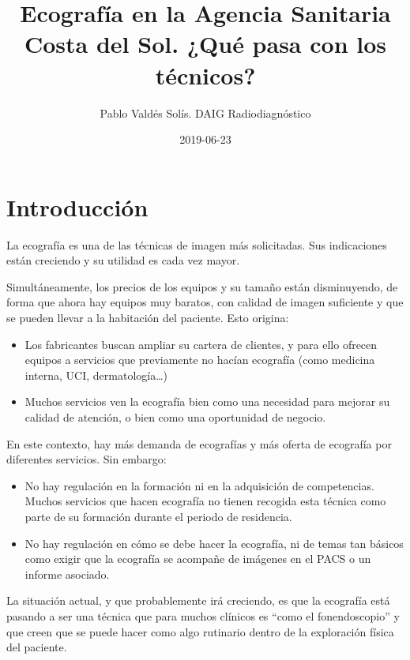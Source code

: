 \documentclass[]{article}
\title{Ecografía en la Agencia Sanitaria Costa del Sol. ¿Qué pasa con los técnicos?}
\author{Pablo Valdés Solís. DAIG Radiodiagnóstico}
\date{2019-06-23}
\providecommand{\tightlist}{%
  \setlength{\itemsep}{0pt}\setlength{\parskip}{0pt}}
\begin{document}
\maketitle

{
\setcounter{tocdepth}{2}
\tableofcontents
}
\hypertarget{introduccion}{%
\section{Introducción}\label{introduccion}}

La ecografía es una de las técnicas de imagen más solicitadas. Sus indicaciones están creciendo y su utilidad es cada vez mayor.

Simultáneamente, los precios de los equipos y su tamaño están disminuyendo, de forma que ahora hay equipos muy baratos, con calidad de imagen suficiente y que se pueden llevar a la habitación del paciente. Esto origina:

\begin{itemize}
\tightlist
\item
  Los fabricantes buscan ampliar su cartera de clientes, y para ello ofrecen equipos a servicios que previamente no hacían ecografía (como medicina interna, UCI, dermatología\ldots{})
\item
  Muchos servicios ven la ecografía bien como una necesidad para mejorar su calidad de atención, o bien como una oportunidad de negocio.
\end{itemize}

En este contexto, hay más demanda de ecografías y más oferta de ecografía por diferentes servicios. Sin embargo:

\begin{itemize}
\tightlist
\item
  No hay regulación en la formación ni en la adquisición de competencias. Muchos servicios que hacen ecografía no tienen recogida esta técnica como parte de su formación durante el periodo de residencia.
\item
  No hay regulación en cómo se debe hacer la ecografía, ni de temas tan básicos como exigir que la ecografía se acompañe de imágenes en el PACS o un informe asociado.
\end{itemize}

La situación actual, y que probablemente irá creciendo, es que la ecografía está pasando a ser una técnica que para muchos clínicos es ``como el fonendoscopio'' y que creen que se puede hacer como algo rutinario dentro de la exploración física del paciente.
\end{document}
